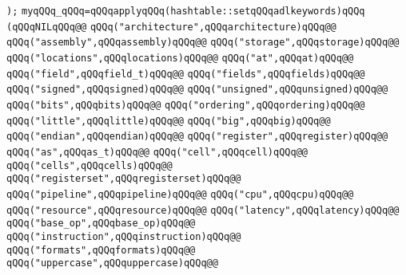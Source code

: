 \verb|);|\newline
\newline
\verb|myqQQq_qQQq=qQQqapplyqQQq(hashtable::setqQQqadlkeywords)qQQq|\newline
\verb|(qQQqNILqQQq@@|\newline
\verb|qQQq("architecture",qQQqarchitecture)qQQq@@|\newline
\verb|qQQq("assembly",qQQqassembly)qQQq@@|\newline
\verb|qQQq("storage",qQQqstorage)qQQq@@|\newline
\verb|qQQq("locations",qQQqlocations)qQQq@@|\newline
\verb|qQQq("at",qQQqat)qQQq@@|\newline
\verb|qQQq("field",qQQqfield_t)qQQq@@|\newline
\verb|qQQq("fields",qQQqfields)qQQq@@|\newline
\verb|qQQq("signed",qQQqsigned)qQQq@@|\newline
\verb|qQQq("unsigned",qQQqunsigned)qQQq@@|\newline
\verb|qQQq("bits",qQQqbits)qQQq@@|\newline
\verb|qQQq("ordering",qQQqordering)qQQq@@|\newline
\verb|qQQq("little",qQQqlittle)qQQq@@|\newline
\verb|qQQq("big",qQQqbig)qQQq@@|\newline
\verb|qQQq("endian",qQQqendian)qQQq@@|\newline
\verb|qQQq("register",qQQqregister)qQQq@@|\newline
\verb|qQQq("as",qQQqas_t)qQQq@@|\newline
\verb|qQQq("cell",qQQqcell)qQQq@@|\newline
\verb|qQQq("cells",qQQqcells)qQQq@@|\newline
\verb|qQQq("registerset",qQQqregisterset)qQQq@@|\newline
\verb|qQQq("pipeline",qQQqpipeline)qQQq@@|\newline
\verb|qQQq("cpu",qQQqcpu)qQQq@@|\newline
\verb|qQQq("resource",qQQqresource)qQQq@@|\newline
\verb|qQQq("latency",qQQqlatency)qQQq@@|\newline
\verb|qQQq("base_op",qQQqbase_op)qQQq@@|\newline
\verb|qQQq("instruction",qQQqinstruction)qQQq@@|\newline
\verb|qQQq("formats",qQQqformats)qQQq@@|\newline
\verb|qQQq("uppercase",qQQquppercase)qQQq@@|\newline
